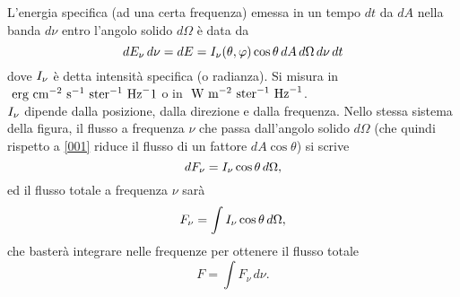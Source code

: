 \begin{figure}[h!]
        \centering
\end{figure}
\noindent 
L'energia specifica (ad una certa frequenza) emessa in un tempo $dt$ da $dA$ nella banda $d\nu$ entro l'angolo solido $d\Omega$ è data da 
\begin{equation}
    dE_\nu \,d\nu=dE=I_\nu(\theta, \varphi)\cos\theta \,dA\,d\Omega \,d\nu\, dt
    \label{002}
\end{equation}
dove $I_\nu$ è detta intensità specifica (o radianza). Si misura in $\text{ erg}\text{ cm}^{-2}\text{ s}^{-1}\text{ ster}^{-1}\text{ Hz}^-1$ o in $\text{ W}\text{ m}^{-2}\text{ ster}^{-1}\text{ Hz}^{-1}$.\\
$I_\nu$ dipende dalla posizione, dalla direzione e dalla frequenza. Nello stessa sistema della figura, il flusso a frequenza $\nu$ che passa dall'angolo solido $d\Omega$ (che quindi rispetto a \ref{001} riduce il flusso di un fattore $dA \cos\theta$) si scrive
\begin{equation*}
    dF_\nu=I_\nu \cos\theta\, d\Omega,
\end{equation*}
ed il flusso totale a frequenza $\nu$ sarà
\begin{equation*}
    F_\nu = \int I_\nu\cos\theta \,d\Omega,
\end{equation*}
che basterà integrare nelle frequenze per ottenere il flusso totale
\begin{equation*}
    F=\int F_\nu\, d\nu.
\end{equation*}
